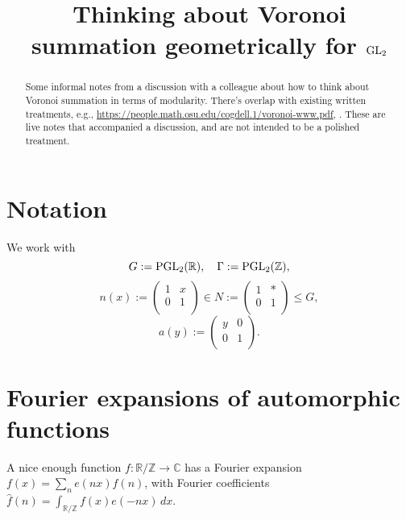 \documentclass[reqno]{amsart} 
\begin{document}
\title{Thinking about Voronoi summation geometrically for $\operatorname{GL}_2$}

\begin{abstract}
  Some informal notes from a discussion with a colleague about how to think about Voronoi summation in terms of modularity.  There's overlap with existing written treatments, e.g., \url{https://people.math.osu.edu/cogdell.1/voronoi-www.pdf}, \cite[Appendix A]{KMV02}.  These are live notes that accompanied a discussion, and are not intended to be a polished treatment.
\end{abstract}

\section{Notation}
We work with
\begin{equation*}
  G := \operatorname{PGL}_2(\mathbb{R}), \quad \Gamma := \operatorname{PGL}_2(\mathbb{Z}),
\end{equation*}
\begin{equation*}
  n(x) :=
  \begin{pmatrix}
    1    & x \\
    0 & 1 \\
  \end{pmatrix} \in N :=
  \begin{pmatrix}
    1    & \ast \\
    0         & 1 \\
  \end{pmatrix} \leq G,
\end{equation*}
\begin{equation*}
  a(y) :=
  \begin{pmatrix}
    y & 0 \\
    0 & 1 \\
  \end{pmatrix}.
\end{equation*}

\section{Fourier expansions of automorphic functions}
A nice enough function $f : \mathbb{R} / \mathbb{Z} \rightarrow \mathbb{C}$ has a Fourier expansion $f(x) = \sum_n e(n x) \hat{f}(n)$, with Fourier coefficients $\hat{f}(n) = \int_{\mathbb{R} / \mathbb{Z}} f(x) e(-n x) \, d x$.
\end{document}
